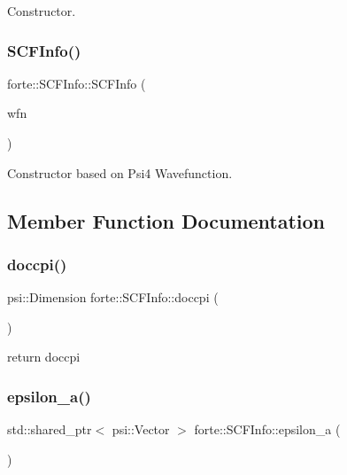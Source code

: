 Constructor. 

\mbox{\label{classforte_1_1_s_c_f_info_a8d7c54510805b10fe84b88e6d9888832}} 
\subsubsection{\texorpdfstring{S\+C\+F\+Info()}{SCFInfo()}\hspace{0.1cm}{\footnotesize\ttfamily [2/2]}}
{\footnotesize\ttfamily forte\+::\+S\+C\+F\+Info\+::\+S\+C\+F\+Info (\begin{DoxyParamCaption}\item[{psi\+::\+Shared\+Wavefunction}]{wfn }\end{DoxyParamCaption})}



Constructor based on Psi4 Wavefunction. 



\subsection{Member Function Documentation}
\mbox{\label{classforte_1_1_s_c_f_info_a6724509a53cf02da7b2ceae0dcf5974a}} 
\subsubsection{\texorpdfstring{doccpi()}{doccpi()}}
{\footnotesize\ttfamily psi\+::\+Dimension forte\+::\+S\+C\+F\+Info\+::doccpi (\begin{DoxyParamCaption}{ }\end{DoxyParamCaption})}



return doccpi 

\mbox{\label{classforte_1_1_s_c_f_info_aa28a836920447e78d806523759d46d7e}} 
\subsubsection{\texorpdfstring{epsilon\+\_\+a()}{epsilon\_a()}}
{\footnotesize\ttfamily std\+::shared\+\_\+ptr$<$ psi\+::\+Vector $>$ forte\+::\+S\+C\+F\+Info\+::epsilon\+\_\+a (\begin{DoxyParamCaption}{ }\end{DoxyParamCaption})}



